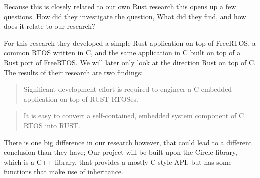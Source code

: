 Because this is closely related to our own Rust research this opens up a few questions.
How did they investigate the question, What did they find, and how does it relate to our research?

For this research they developed a simple Rust application on top of FreeRTOS,
a common RTOS written in C, and the same application in C built on top of a Rust port of FreeRTOS.
We will later only look at the direction Rust on top of C.
The results of their research are two findings:
\begin{quotation}
  Significant development effort is required to engineer a C embedded application on top of RUST RTOSes.
\end{quotation}
\begin{quotation}
  It is easy to convert a self-contained, embedded system component of C RTOS into RUST.
\end{quotation}

There is one big difference in our research however, that could lead to a different conclusion than they have;
Our project will be built upon the Circle library, which is a C++ library, that provides a mostly C-style API,
but has some functions that make use of inheritance.